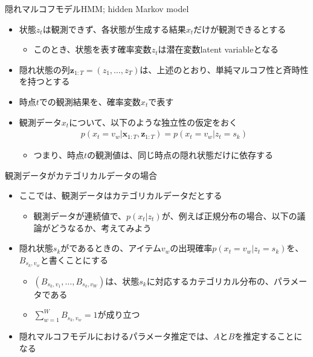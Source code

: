 \documentclass[aspectratio=169,unicode,dvipdfmx,14pt]{beamer}
\begin{document}
\begin{frame}{隠れマルコフモデルHMM; hidden Markov model}
\begin{itemize}
\item 状態$z_t$は観測できず、各状態が生成する結果$x_t$だけが観測できるとする
\begin{itemize}
\item このとき、状態を表す確率変数$z_t$は潜在変数latent variableとなる
\end{itemize}
\item 隠れ状態の列$\bm{z}_{1:T}=(z_1,\ldots,z_T)$は、上述のとおり、単純マルコフ性と斉時性を持つとする
\item 時点$t$での観測結果を、確率変数$x_t$で表す
\item 観測データ$x_t$について、以下のような独立性の仮定をおく
\begin{align}
p(x_t=v_w| \bm{x}_{1:T},\bm{z}_{1:T}) = p(x_t=v_w|z_t=s_k)
\end{align}
\vspace{-.2in}
\begin{itemize}
\item つまり、時点$t$の観測値は、同じ時点の隠れ状態だけに依存する
\end{itemize}
\end{itemize}
\end{frame}

\begin{frame}{観測データがカテゴリカルデータの場合}
\begin{itemize}
\item ここでは、観測データはカテゴリカルデータだとする
\begin{itemize}
\item 観測データが連続値で、$p(x_t|z_t)$が、例えば正規分布の場合、以下の議論がどうなるか、考えてみよう
\end{itemize}
\item 隠れ状態$s_k$がであるときの、アイテム$v_w$の出現確率$p(x_t=v_w|z_t=s_k)$を、$B_{s_k,v_w}$と書くことにする
\begin{itemize}
\item $(B_{s_k,v_1}, \ldots, B_{s_k,v_W})$は、状態$s_k$に対応するカテゴリカル分布の、パラメータである
\item $\sum_{w=1}^W B_{s_k,v_w} = 1$が成り立つ
\end{itemize}
\item 隠れマルコフモデルにおけるパラメータ推定では、$A$と$B$を推定することになる
\end{itemize}
\end{frame}
\end{document}
